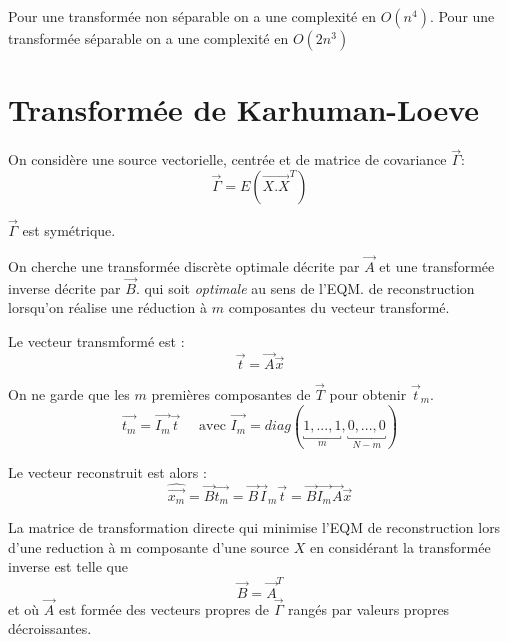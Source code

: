 \documentclass[main.tex]{subfiles}
\begin{document}
\begin{rem}
  Pour une transformée non séparable on a une complexité en $O(n^4)$.
  Pour une transformée séparable on a une complexité en $O(2n^3)$
\end{rem}

\section{Transformée de Karhuman-Loeve}

On considère une source vectorielle, centrée et de matrice de covariance $\vec{\Gamma}$:
\[
  \vec{\Gamma} = E(\vec{X.X}^T)
\]
\begin{rem}
  $\vec{\Gamma}$ est symétrique.
\end{rem}
On cherche une transformée discrète optimale décrite par $\vec{A}$ et une transformée inverse décrite par $\vec{B}$. qui soit \emph{optimale} au sens de l'EQM. de reconstruction lorsqu'on réalise une réduction à $m$ composantes du vecteur transformé.

Le vecteur transmformé est :
\[
  \vec{t} = \vec{A}\vec{x}
\]

On ne garde que les $m$ premières composantes de $\vec{T}$ pour obtenir $\vec{t}_{m}$.
\[
  \vec{t_m} = \vec{I_m} \vec{t} \quad \text{ avec } \vec{I_m} = diag(\underbracket{1, ... ,1 }_{m},\underbracket{0, ..., 0}_{N-m})
\]

Le vecteur reconstruit est alors :
\[
  \hat{\vec{x_m}} =\vec{B}\vec{t_m} = \vec{B}\vec{I}_m\vec{t} =\vec{B}\vec{I_m}\vec{A}\vec{x}
\]


\begin{thm}
  La matrice de transformation directe qui minimise l'EQM de reconstruction lors d'une reduction à m composante d'une source $X$ en considérant la transformée inverse est telle que
  \[\vec{B} = \vec{A}^T\]
  et où $\vec{A}$ est formée des vecteurs propres de $\vec{\Gamma}$ rangés par valeurs propres décroissantes.
\end{thm}
\end{document}
